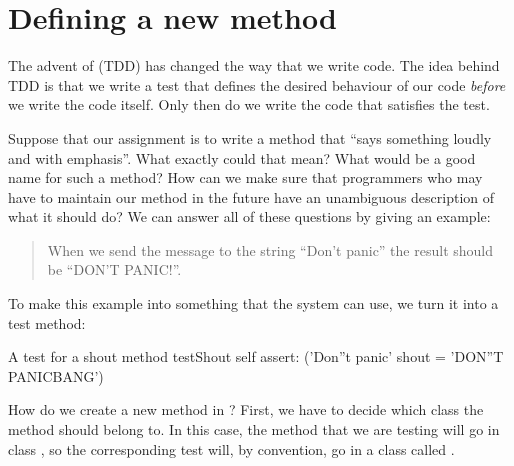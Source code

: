 \documentclass[a4paper,10pt,twoside]{book}
\begin{document}
\section{Defining a new method}

The advent of \cite{Beck03a} (TDD) has changed the way that we write code.  
The idea behind TDD is that we write a test that defines the desired behaviour of our code \emph{before} we write the code itself.
Only then do we write the code that satisfies the test.

Suppose that our assignment is to write a method that ``says something loudly and with emphasis''.  What exactly could that mean?  What would be a good name for such a method?  How can we make sure  that programmers who may have to maintain our method in the future have an unambiguous description of what it should do?   We can answer all of these questions by giving an example:

\begin{quote}
When we send the message  to the string ``Don't panic'' the result should be ``DON'T PANIC!''.
\end{quote}

\noindent
To make this example into something that the system can use, we turn it into a test method:

\begin{method}[testShout]{A test for a shout method}
testShout
	self assert: ('Don''t panic' shout = 'DON''T PANICBANG')
\end{method} %

How do we create a new method in \pharo?   First, we have to decide which class the method should belong to.
In this case, the  method that we are testing will go in class , so the corresponding test will, by convention, go in a class called .
\end{document}
